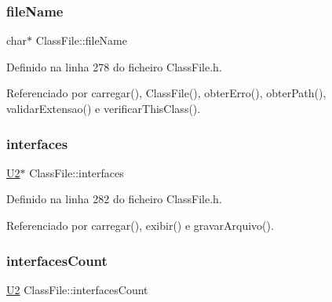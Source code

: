\mbox{\label{classClassFile_a2789cf19be5abaeadf96f83de33174a4}} 
\subsubsection{\texorpdfstring{file\+Name}{fileName}}
{\footnotesize\ttfamily char$\ast$ Class\+File\+::file\+Name\hspace{0.3cm}{\ttfamily [private]}}



Definido na linha 278 do ficheiro Class\+File.\+h.



Referenciado por carregar(), Class\+File(), obter\+Erro(), obter\+Path(), validar\+Extensao() e verificar\+This\+Class().

\mbox{\label{classClassFile_a94d1e4e835476f47e3a8b81ecd0301c0}} 
\subsubsection{\texorpdfstring{interfaces}{interfaces}}
{\footnotesize\ttfamily \hyperlink{BasicTypes_8h_a90240657108b1b457eef9d3f76e0202e}{U2}$\ast$ Class\+File\+::interfaces\hspace{0.3cm}{\ttfamily [private]}}



Definido na linha 282 do ficheiro Class\+File.\+h.



Referenciado por carregar(), exibir() e gravar\+Arquivo().

\mbox{\label{classClassFile_a1bbca13f93ec21beffa8a56e360c9f8d}} 
\subsubsection{\texorpdfstring{interfaces\+Count}{interfacesCount}}
{\footnotesize\ttfamily \hyperlink{BasicTypes_8h_a90240657108b1b457eef9d3f76e0202e}{U2} Class\+File\+::interfaces\+Count\hspace{0.3cm}{\ttfamily [private]}}



